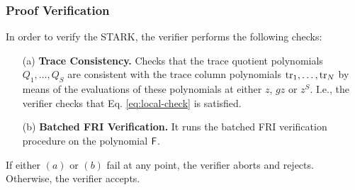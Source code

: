 


\subsubsection*{Proof Verification}

In order to verify the STARK, the verifier performs the following checks:
\begin{enumerate}
  \item[(a)] \textbf{Trace Consistency.} Checks that the trace quotient polynomials $Q_1, \dots, Q_S$ are consistent with the trace column polynomials $\text{tr}_1, \dots, \text{tr}_N$ by means of the evaluations of these polynomials at either $z$, $gz$ or $z^S$. I.e., the verifier checks that Eq. \eqref{eq:local-check} is satisfied. 
  
  \item[(b)] \textbf{Batched FRI Verification.} It runs the batched FRI verification procedure on the polynomial $\textsf{F}$.

  
\end{enumerate}
If either $(a)$ or $(b)$ fail at any point, the verifier aborts and rejects. Otherwise, the verifier accepts.

